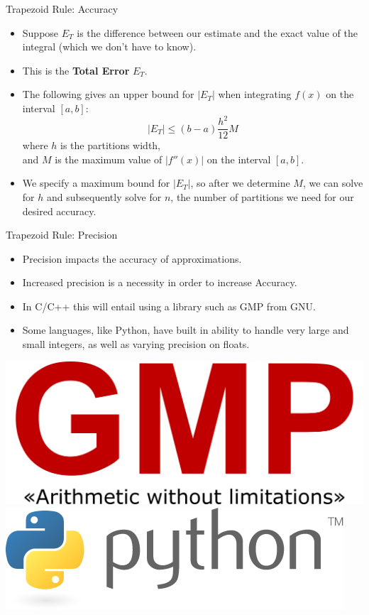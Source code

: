 \documentclass[t]{beamer}
\begin{document}
\begin{frame}{Trapezoid Rule: Accuracy}
	\begin{itemize}
		\item Suppose $E_T$ is the difference between our estimate and the exact value of the integral (which we don't have to know).
		\item This is the \textbf{Total Error} $E_T$.
		\item The following gives an upper bound for $|E_T|$ when integrating $f(x)$ on the interval $[a,b]$:
		\[|E_T|\leq(b-a)\frac{h^2}{12}M\]
		where $h$ is the partitions width,\\
		and $M$ is the maximum value of $|f''(x)|$ on the interval $[a,b]$.
		\item We specify a maximum bound for $|E_T|$, so after we determine $M$, we can solve for $h$ and subsequently solve for $n$, the number of partitions we need for our desired accuracy.
	\end{itemize}
\end{frame}

\begin{frame}{Trapezoid Rule: Precision}
	\begin{itemize}
		\item Precision impacts the accuracy of approximations.
		\item Increased precision is a necessity in order to increase Accuracy.
		\item In C/C++ this will entail using a library such as GMP from GNU.
		\item Some languages, like Python, have built in ability to handle very
		      large and small integers, as well as varying precision on floats.
	\end{itemize}
	\begin{multicols}{2}
		\center
		\includegraphics[scale=0.05]{assets/GMPLogo} \\
		\hspace{-4em}
		\includegraphics[scale=0.3]{assets/python-logo}
	\end{multicols}
\end{frame}
\end{document}
